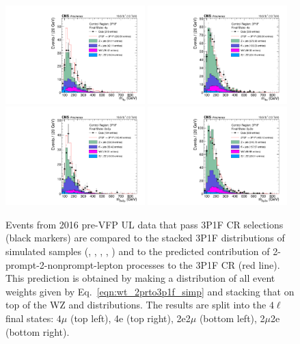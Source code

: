 \begin{figure}[!htbp]
	\begin{center}
		\includegraphics[width=0.48\textwidth]{figures/higgsmassmeas/redbkg/cr/UL2016preVFP_CR_3P1F_4mu.pdf}
		\includegraphics[width=0.48\textwidth]{figures/higgsmassmeas/redbkg/cr/UL2016preVFP_CR_3P1F_4e.pdf}
		\includegraphics[width=0.48\textwidth]{figures/higgsmassmeas/redbkg/cr/UL2016preVFP_CR_3P1F_2e2mu.pdf}
		\includegraphics[width=0.48\textwidth]{figures/higgsmassmeas/redbkg/cr/UL2016preVFP_CR_3P1F_2mu2e.pdf}
		\caption{
			Events from 2016 pre-VFP UL data that pass 3P1F CR selections (black markers) 
			are compared to the stacked 3P1F distributions of simulated samples
			(\Zplusjets, \ttbarplusjets, \WZ, \ZZ, \Zgammastar)
			and to the predicted contribution of 2-prompt-2-nonprompt-lepton processes to the 3P1F CR (red line).
			This prediction is obtained by making a distribution of all event weights given by Eq.~\ref{eqn:wt_2prto3p1f_simp} and stacking that on top of the WZ and \ZZ distributions.
			The results are split into the $4\ell$ final states:
			$4\mu$ (top left), 4e (top right), 2e2$\mu$ (bottom left), 2$\mu$2e (bottom right).
		}
		\label{cr_plots_3p1f_2016prevfp}
	\end{center}
\end{figure}
